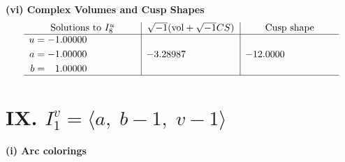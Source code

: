 \documentclass[1p]{elsarticle_modified}
\theoremstyle{definition}
\newcommand{\I}{\sqrt{-1}}
\begin{document}
\newpage\flushleft \textbf{(vi) Complex Volumes and Cusp Shapes}
$$\begin{array}{c|c|c}  
\text{Solutions to }I^u_{8}& \I (\text{vol} + \sqrt{-1}CS) & \text{Cusp shape}\\
 \hline 
\begin{aligned}
u &= -1.00000\phantom{ +0.000000I} \\
a &= -1.00000\phantom{ +0.000000I} \\
b &= \phantom{-}1.00000\phantom{ +0.000000I}\end{aligned}
 & -3.28987\phantom{ +0.000000I} & -12.0000\phantom{ +0.000000I}\\
 \hline 
 \end{array}$$\newpage\newpage\renewcommand{\arraystretch}{1}
\centering \section*{IX. $I^v_{1}= \langle a,\;b-1,\;v-1 \rangle$}
\flushleft \textbf{(i) Arc colorings}\\
\end{document}
